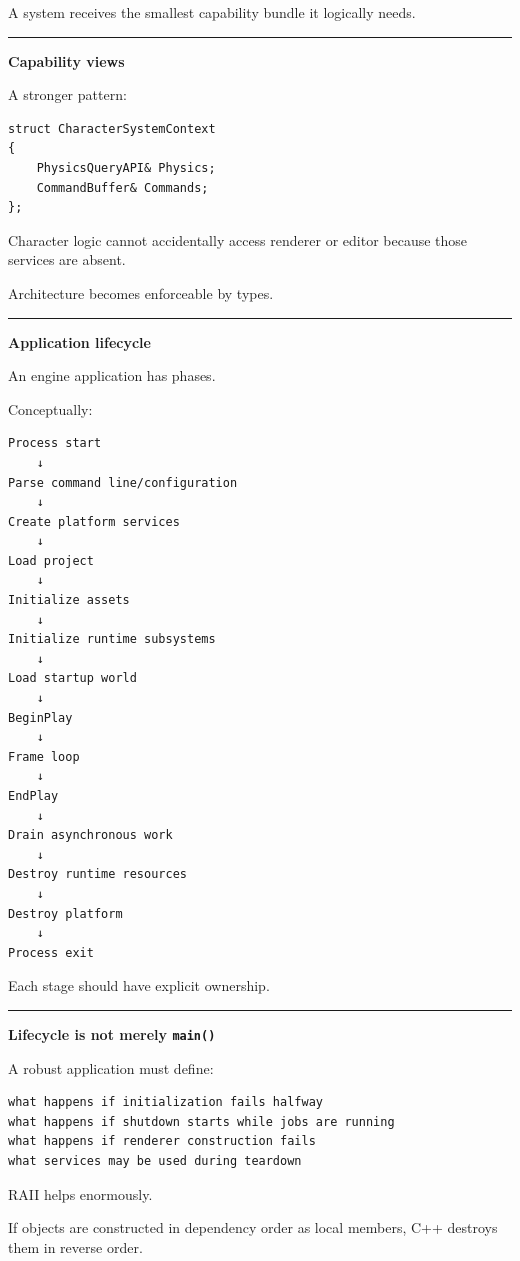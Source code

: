A system receives the smallest capability bundle it logically needs.

\begin{center}\rule{0.5\linewidth}{0.5pt}\end{center}

\textbf{Capability views}

A stronger pattern:

\begin{verbatim}
struct CharacterSystemContext
{
    PhysicsQueryAPI& Physics;
    CommandBuffer& Commands;
};
\end{verbatim}

Character logic cannot accidentally access renderer or editor because those services are absent.

Architecture becomes enforceable by types.

\begin{center}\rule{0.5\linewidth}{0.5pt}\end{center}

\textbf{Application lifecycle}

An engine application has phases.

Conceptually:

\begin{verbatim}
Process start
    ↓
Parse command line/configuration
    ↓
Create platform services
    ↓
Load project
    ↓
Initialize assets
    ↓
Initialize runtime subsystems
    ↓
Load startup world
    ↓
BeginPlay
    ↓
Frame loop
    ↓
EndPlay
    ↓
Drain asynchronous work
    ↓
Destroy runtime resources
    ↓
Destroy platform
    ↓
Process exit
\end{verbatim}

Each stage should have explicit ownership.

\begin{center}\rule{0.5\linewidth}{0.5pt}\end{center}

\textbf{Lifecycle is not merely \texttt{main()}}

A robust application must define:

\begin{verbatim}
what happens if initialization fails halfway
what happens if shutdown starts while jobs are running
what happens if renderer construction fails
what services may be used during teardown
\end{verbatim}

RAII helps enormously.

If objects are constructed in dependency order as local members, C++ destroys them in reverse order.

